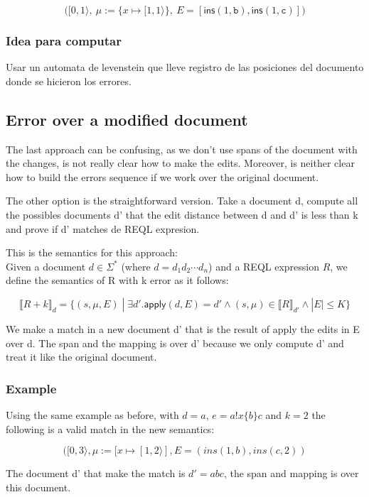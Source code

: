\documentclass{article}
\begin{document}
\[
\Big([0,1\rangle,\ \mu := \{x \mapsto [1,1\rangle\},\ E = [\mathsf{ins}(1,\texttt{b}), \mathsf{ins}(1,\texttt{c})]\Big)
\]

\subsubsection{Idea para computar}

Usar un automata de levenstein que lleve registro de las posiciones del documento donde se hicieron los errores.


\subsection{Error over a modified document}

The last approach can be confusing, as we don't use spans of the document with the changes, is not really clear how to make the edits. Moreover, is neither clear how to build the errors sequence if we work over the original document.

The other option is the straightforward version. Take a document d, compute all the possibles documents d' that the edit distance between d and d' is less than k and prove if d' matches de REQL expresion.

This is the semantics for this approach: \\

Given a document $d \in \Sigma^*$ (where $d = d_1d_2\cdots d_n$) and a REQL expression $R$, we define the semantics of R with k error as it follows:


\[ \llbracket R + k \rrbracket_d = \{(s, \mu, E) \; | \; \exists d'. \mathsf{apply}(d, E) = d' \land (s, \mu) \in \llbracket R \rrbracket_{d'} \land | E | \leq K  \}\]


We make a match in a new document d' that is the result of apply the edits in E over d. The span and the mapping is over d' because we only compute d' and treat it like the original document.

\subsubsection{Example}

Using the same example as before, with $d = a$, $e= a!x\{b\}c$ and $k = 2$ the following is a valid match in the new semantics:

\[([0, 3\rangle, \mu := [x \mapsto [1, 2\rangle], E = (ins(1, b), ins(c,2))\]

The document d' that make the  match is $d' = abc$, the span and mapping is over this document.
\end{document}
